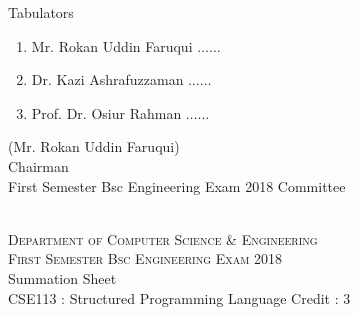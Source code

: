 \documentclass[12pt]{article}
\begin{document}
            \begin{table}[hb]
            	\centering
            \begin{minipage}[b]{0.5\linewidth} %
            {\centering Tabulators }
            \begin{enumerate}
                \item Mr. Rokan Uddin Faruqui \hspace*{1ex} $\ldots \ldots  $  
                \item Dr. Kazi Ashrafuzzaman \hspace*{1ex} $\ldots \ldots  $  
                \item Prof. Dr. Osiur Rahman \hspace*{1ex} $\ldots \ldots $  
            \end{enumerate} 

            \end{minipage}
            \hspace*{1.2cm}
            \begin{minipage}[b]{0.4\linewidth} \centering
            (Mr. Rokan Uddin Faruqui) \\
            Chairman  \hspace*{1ex} \\
           First Semester Bsc Engineering Exam 2018 Committee
            \end{minipage}
            \end{table}
            \clearpage
    \centering
    \begin{minipage}[m]{.8\textwidth} \centering 
	\smallskip
	\\
	\textsc{Department of Computer Science \& Engineering}\\
	\textsc{ First Semester Bsc Engineering Exam 2018}\\
    {\large {\sc Summation Sheet}}\\  
     {\centering CSE113 : Structured Programming Language     Credit : 3 } \\
    \end{minipage} 
\end{document}
